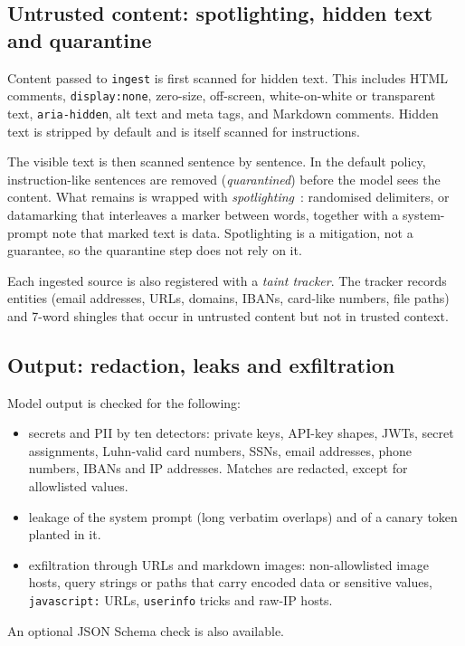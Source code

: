 \documentclass[10pt]{article}
\begin{document}
\subsection{Untrusted content: spotlighting, hidden text and quarantine}
Content passed to \texttt{ingest} is first scanned for hidden text. This includes HTML comments, \texttt{display:none}, zero-size, off-screen, white-on-white or transparent text, \texttt{aria-hidden}, alt text and meta tags, and Markdown comments. Hidden text is stripped by default and is itself scanned for instructions.

The visible text is then scanned sentence by sentence. In the default policy, instruction-like sentences are removed (\emph{quarantined}) before the model sees the content. What remains is wrapped with \emph{spotlighting}~\citep{hines2024spotlighting}: randomised delimiters, or datamarking that interleaves a marker between words, together with a system-prompt note that marked text is data. Spotlighting is a mitigation, not a guarantee, so the quarantine step does not rely on it.

Each ingested source is also registered with a \emph{taint tracker}. The tracker records entities (email addresses, URLs, domains, IBANs, card-like numbers, file paths) and 7-word shingles that occur in untrusted content but not in trusted context.

\subsection{Output: redaction, leaks and exfiltration}
Model output is checked for the following:
\begin{itemize}
\item secrets and PII by ten detectors: private keys, API-key shapes, JWTs, secret assignments, Luhn-valid card numbers, SSNs, email addresses, phone numbers, IBANs and IP addresses. Matches are redacted, except for allowlisted values.
\item leakage of the system prompt (long verbatim overlaps) and of a canary token planted in it.
\item exfiltration through URLs and markdown images: non-allowlisted image hosts, query strings or paths that carry encoded data or sensitive values, \texttt{javascript:} URLs, \texttt{userinfo} tricks and raw-IP hosts.
\end{itemize}
An optional JSON Schema check is also available.
\end{document}
